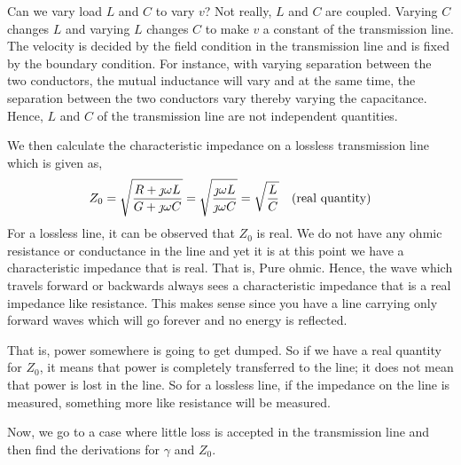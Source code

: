 Can we vary load $L$ and $C$ to vary $v$? Not really, $L$ and $C$ are coupled. Varying $C$ changes $L$ and varying $L$ changes $C$ to make $v$ a constant of the transmission line. The velocity is decided by the field condition in the transmission line and is fixed by the boundary condition. For instance, with varying separation between the two conductors, the mutual inductance will vary and at the same time, the separation between the two conductors vary thereby varying the capacitance. Hence, $L$ and $C$ of the transmission line are not independent quantities.

We then calculate the characteristic impedance on a lossless transmission line which is given as,
\begin{dmath*}
Z_0 = \sqrt{\frac{R + \jmath\omega L}{G + \jmath\omega C}} = \sqrt{\frac{\jmath\omega L}{\jmath\omega C}} = \sqrt{\frac{L}{C}} \quad\textnormal{(real quantity)}
\end{dmath*}
For a lossless line, it can be observed that $Z_0$ is real. We do not have any ohmic resistance or conductance in the line and yet it is at this point we have a characteristic impedance that is real. That is, Pure ohmic. Hence, the wave which travels forward or backwards always sees a characteristic impedance that is a real impedance like resistance. This makes sense since you have a line carrying only forward waves which will go forever and no energy is reflected. 

That is, power somewhere is going to get dumped. So if we have a real quantity for $Z_0$, it means that power is completely transferred to the line; it does not mean that power is lost in the line. So for a lossless line, if the impedance on the line is measured, something more like resistance will be measured.

Now, we go to a case where little loss is accepted in the transmission line and then find the derivations for $\gamma$ and $Z_0$.
